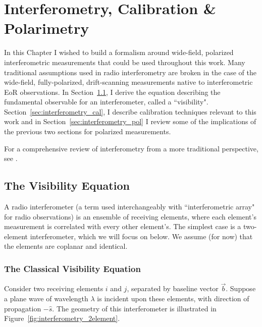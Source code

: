 \chapter{Interferometry, Calibration \& Polarimetry}
\label{chapter:interferometry}

In this Chapter I wished to build a formalism around wide-field, polarized interferometric measurements that could be used throughout this work. Many traditional assumptions used in radio interferometry are broken in the case of the wide-field, fully-polarized, drift-scanning measurements native to interferometric EoR observations. In Section~\ref{sec:interferometry_vis}, I derive the equation describing the fundamental observable for an interferometer, called a ``visibility". Section~\ref{sec:interferometry_cal}, I describe calibration techniques relevant to this work and in Section~\ref{sec:interferometry_pol} I review some of the implications of the previous two sections for polarized measurements.

For a comprehensive review of interferometry from a more traditional perspective, see \cite{TMS}.

\section{The Visibility Equation}
\label{sec:interferometry_vis}

A radio interferometer (a term used interchangeably with ``interferometric array" for radio observations) is an ensemble of receiving elements, where each element's measurement is correlated with every other element's. The simplest case is a two-element interferometer, which we will focus on below. We assume (for now) that the elements are coplanar and identical.

\subsection{The Classical Visibility Equation}

Consider two receiving elements $i$ and $j$, separated by baseline vector $\vec{b}$. Suppose a plane wave of wavelength $\lambda$ is incident upon these elements, with direction of propagation $-\hat{s}$. The geometry of this interferometer is illustrated in Figure~\ref{fig:interferometry_2element}.


